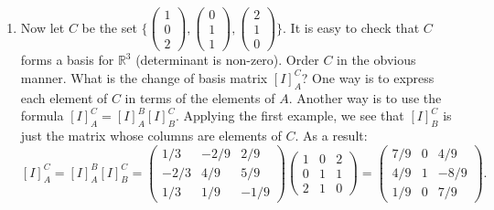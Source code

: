 \documentclass[12pt]{article}
\begin{document}
\begin{enumerate}
\item Now let $C$ be the set $\Bigg\lbrace \begin{pmatrix} 1\\0\\2 \end{pmatrix}, \begin{pmatrix} 0\\1\\1 \end{pmatrix}, \begin{pmatrix} 2\\1\\0 \end{pmatrix} \Bigg\rbrace$.  It is easy to check that $C$ forms a basis for $\mathbb{R}^3$ (determinant is non-zero).  Order $C$ in the obvious manner.  What is the change of basis matrix $[I]^C_A$?  One way is to express each element of $C$ in terms of the elements of $A$.  Another way is to use the formula $[I]^C_A=[I]^B_A[I]^C_B$.    Applying the first example, we see that $[I]^C_B$ is just the matrix whose columns are elements of $C$.  As a result: $$[I]^C_A=[I]^B_A[I]^C_B=\begin{pmatrix} 1/3&-2/9&2/9 \\ -2/3&4/9&5/9 \\ 1/3&1/9&-1/9 \end{pmatrix} \begin{pmatrix} 1&0&2 \\ 0&1&1 \\ 2&1&0 \end{pmatrix}=\begin{pmatrix} 7/9&0&4/9 \\ 4/9&1&-8/9 \\ 1/9&0&7/9 \end{pmatrix}. $$
\end{enumerate}
\end{document}
